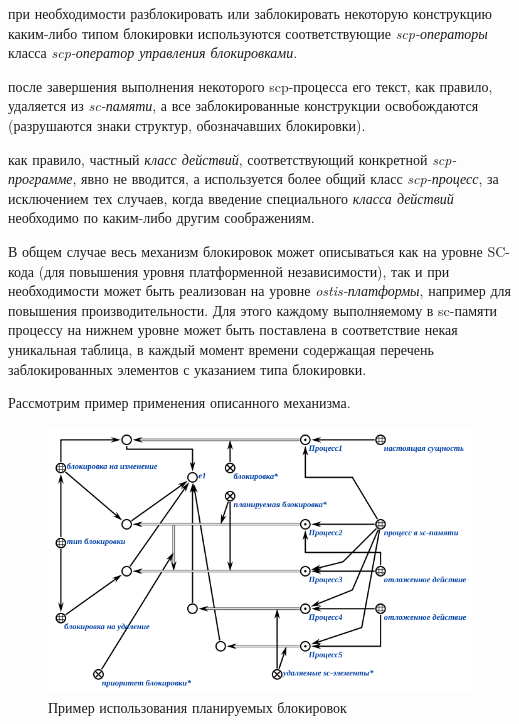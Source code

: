 \begin{textitemize}
\item при необходимости разблокировать или заблокировать некоторую конструкцию каким-либо типом блокировки используются соответствующие \textit{scp-операторы} класса \textit{scp-оператор управления блокировками}.
\item после завершения выполнения некоторого scp-процесса его текст, как правило, удаляется из \textit{sc-памяти}, а все заблокированные конструкции освобождаются (разрушаются знаки структур, обозначавших блокировки).
\item как правило, частный \textit{класс действий}, соответствующий конкретной \textit{scp-программе}, явно не вводится, а используется более общий класс \textit{scp-процесс}, за исключением тех случаев, когда введение	специального \textit{класса действий} необходимо по каким-либо другим соображениям.
\end{textitemize}

В общем случае весь механизм блокировок может описываться как на уровне SC-кода (для повышения уровня платформенной независимости), так и при необходимости может быть реализован на уровне \textit{ostis-платформы}, например для повышения производительности. Для этого каждому выполняемому в sc-памяти процессу на нижнем уровне может быть поставлена в соответствие некая уникальная таблица, в каждый момент времени содержащая перечень заблокированных элементов с указанием типа блокировки.

Рассмотрим пример применения описанного механизма.

\begin{figure}[h]
	\centering
	\includegraphics[scale=0.8]{images/part3/chapter_situation_management/plan_lock_1.png}
	\caption{Пример использования планируемых блокировок}
	\label{fig:plan_lock_1}
\end{figure}

